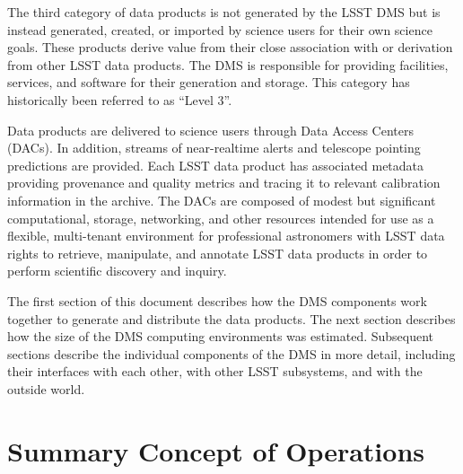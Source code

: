 \documentclass[DM,toc]{lsstdoc}
\begin{document}
The third category of data products is not generated by the LSST DMS but is
instead generated, created, or imported by science users for their own science
goals. These products derive value from their close association with or
derivation from other LSST data products. The DMS is responsible for providing
facilities, services, and software for their generation and storage.  This
category has historically been referred to as ``Level 3''.

Data products are delivered to science users through Data Access
Centers (DACs). In addition, streams of near-realtime alerts and telescope
pointing predictions are provided.  Each LSST data product has associated
metadata providing provenance and quality metrics and tracing it to relevant
calibration information in the archive. The DACs are composed of modest but
significant computational, storage, networking, and other resources intended
for use as a flexible, multi-tenant environment for professional astronomers
with LSST data rights to retrieve, manipulate, and annotate LSST data products
in order to perform scientific discovery and inquiry.

The first section of this document describes how the DMS components work
together to generate and distribute the data products.  The next section
describes how the size of the DMS computing environments was estimated.
Subsequent sections describe the individual components of the DMS in more
detail, including their interfaces with each other, with other LSST subsystems,
and with the outside world.

\section{Summary Concept of Operations}\label{summary-concept-of-operations}
\end{document}
